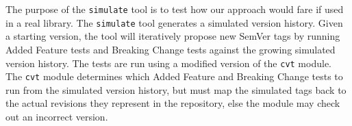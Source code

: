 The purpose of the {\tt simulate} tool is to test how our approach
would fare if used in a real library. The {\tt simulate} tool
generates a simulated version history. Given a starting version, the
tool will iteratively propose new SemVer tags by running Added
Feature tests and Breaking Change tests against the growing simulated
version history. The tests are run using a modified version of the
{\tt cvt} module. The {\tt cvt} module determines which Added Feature
and Breaking Change tests to run from the simulated version history,
but must map the simulated tags back to the actual revisions they
represent in the repository, else the module may check out an
incorrect version.

